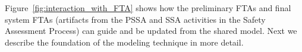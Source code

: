 Figure~\ref{fig:interaction_with_FTA} shows how the preliminary FTAs and final system FTAs (artifacts from the PSSA and SSA activities in the Safety Assessment Process) can guide and be updated from the shared model. 
Next we describe the foundation of the modeling technique in more detail.


